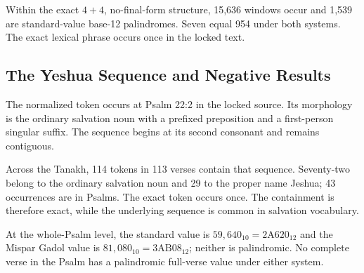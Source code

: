 Within the exact $4+4$, no-final-form structure, 15,636 windows occur and 1,539 are standard-value base-12 palindromes. Seven equal 954 under both systems. The exact lexical phrase  occurs once in the locked text.

\subsection{The Yeshua Sequence and Negative Results}

The normalized token  occurs at Psalm 22:2 in the locked source. Its morphology is the ordinary salvation noun with a prefixed preposition and a first-person singular suffix. The sequence  begins at its second consonant and remains contiguous.

Across the Tanakh, 114 tokens in 113 verses contain that sequence. Seventy-two belong to the ordinary salvation noun and 29 to the proper name Jeshua; 43 occurrences are in Psalms. The exact token  occurs once. The containment is therefore exact, while the underlying sequence is common in salvation vocabulary.

At the whole-Psalm level, the standard value is $59{,}640_{10}=2\mathrm{A}620_{12}$ and the Mispar Gadol value is $81{,}080_{10}=3\mathrm{AB}08_{12}$; neither is palindromic. No complete verse in the Psalm has a palindromic full-verse value under either system.
